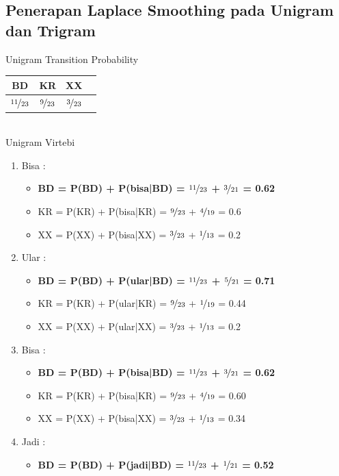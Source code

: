 \documentclass[paper=a4, fontsize=11pt]{scrartcl} %
\numberwithin{equation}{section} %
\numberwithin{figure}{section} %
\numberwithin{table}{section} %
\begin{document}
\subsection{Penerapan Laplace Smoothing pada Unigram dan Trigram}

Unigram Transition Probability \\
\begin{tabular}{ |c | c | c | c |}
	\hline
	BD & KR & XX \\ \hline
	$\nicefrac{11}{23}$ & $\nicefrac{9}{23}$ & $\nicefrac{3}{23}$ \\ \hline
\end{tabular} \\ [8pt]

Unigram Virtebi
\begin{enumerate}
	\item Bisa :
	\begin{itemize}
		\item \textbf{BD = P(BD) + P(bisa|BD) = $\nicefrac{11}{23}$ + $\nicefrac{3}{21}$ = 0.62}				
		\item KR = P(KR) + P(bisa|KR) = $\nicefrac{9}{23}$ + $\nicefrac{4}{19}$ = 0.6
		\item XX = P(XX) + P(bisa|XX) = $\nicefrac{3}{23}$ + $\nicefrac{1}{13}$ = 0.2				
	\end{itemize}
	\item Ular :
	\begin{itemize}
		\item \textbf{BD = P(BD) + P(ular|BD) = $\nicefrac{11}{23}$ + $\nicefrac{5}{21}$ = 0.71}				
		\item KR = P(KR) + P(ular|KR) = $\nicefrac{9}{23}$ + $\nicefrac{1}{19}$ = 0.44
		\item XX = P(XX) + P(ular|XX) = $\nicefrac{3}{23}$ + $\nicefrac{1}{13}$ = 0.2			
	\end{itemize}
	\item Bisa :
	\begin{itemize}
		\item \textbf{BD = P(BD) + P(bisa|BD) = $\nicefrac{11}{23}$ + $\nicefrac{3}{21}$ = 0.62}
		\item KR = P(KR) + P(bisa|KR) = $\nicefrac{9}{23}$ + $\nicefrac{4}{19}$ = 0.60
		\item XX = P(XX) + P(bisa|XX) = $\nicefrac{3}{23}$ + $\nicefrac{1}{13}$ = 0.34				
	\end{itemize}
	\item Jadi : 
	\begin{itemize}
		\item \textbf{BD = P(BD) + P(jadi|BD) = $\nicefrac{11}{23}$ + $\nicefrac{1}{21}$ = 0.52}

\end{itemize}
\end{enumerate}
\end{document}
